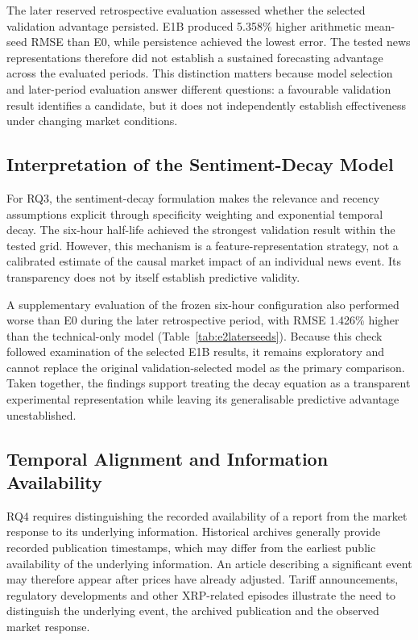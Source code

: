 The later reserved retrospective evaluation assessed whether the selected validation advantage persisted. E1B produced 5.358\% higher arithmetic mean-seed RMSE than E0, while persistence achieved the lowest error. The tested news representations therefore did not establish a sustained forecasting advantage across the evaluated periods. This distinction matters because model selection and later-period evaluation answer different questions: a favourable validation result identifies a candidate, but it does not independently establish effectiveness under changing market conditions.

\subsection{Interpretation of the Sentiment-Decay Model}
\label{subsec:discussion-decay}

For RQ3, the sentiment-decay formulation makes the relevance and recency assumptions explicit through specificity weighting and exponential temporal decay. The six-hour half-life achieved the strongest validation result within the tested grid. However, this mechanism is a feature-representation strategy, not a calibrated estimate of the causal market impact of an individual news event. Its transparency does not by itself establish predictive validity.

A supplementary evaluation of the frozen six-hour configuration also performed worse than E0 during the later retrospective period, with RMSE 1.426\% higher than the technical-only model (Table~\ref{tab:e2laterseeds}). Because this check followed examination of the selected E1B results, it remains exploratory and cannot replace the original validation-selected model as the primary comparison. Taken together, the findings support treating the decay equation as a transparent experimental representation while leaving its generalisable predictive advantage unestablished.

\subsection{Temporal Alignment and Information Availability}
\label{subsec:discussion-timing}

RQ4 requires distinguishing the recorded availability of a report from the market response to its underlying information. Historical archives generally provide recorded publication timestamps, which may differ from the earliest public availability of the underlying information. An article describing a significant event may therefore appear after prices have already adjusted. Tariff announcements, regulatory developments and other XRP-related episodes illustrate the need to distinguish the underlying event, the archived publication and the observed market response.

